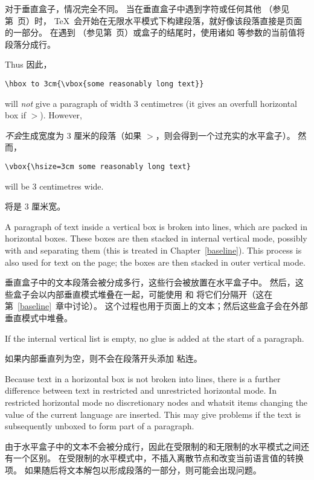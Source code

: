对于垂直盒子，情况完全不同。
当在垂直盒子中遇到字符或任何其他 
（参见第~\pageref{h:com:list}页）时，
\TeX\ 会开始在无限水平模式下构建段落，就好像该段落直接是页面的一部分。
在遇到 
（参见第\pageref{v:com:list}~页）或盒子的结尾时，使用诸如  等参数的当前值将段落分成行。

Thus 因此，\begin{verbatim}
\hbox to 3cm{\vbox{some reasonably long text}}
\end{verbatim}
will {\sl not\/} give a paragraph of width 3 centimetres 
(it gives an overfull horizontal box if ${}>{}$\n{3cm}).
However,

{\sl 不会}生成宽度为 3 厘米的段落（如果 ${}>{}$\n{3cm}，则会得到一个过充实的水平盒子）。
然而，
\begin{verbatim}
\vbox{\hsize=3cm some reasonably long text}
\end{verbatim}
will be 3 centimetres wide.

将是 3 厘米宽。

A paragraph of text inside a vertical box is broken into
lines, which are packed in horizontal boxes.
These boxes  are then stacked
in internal vertical mode, possibly with
 and  separating them
(this is treated in Chapter~\ref{baseline}).
This process is also used for text on the page; the boxes
are then stacked in outer vertical mode.

垂直盒子中的文本段落会被分成多行，这些行会被放置在水平盒子中。
然后，这些盒子会以内部垂直模式堆叠在一起，可能使用  和  将它们分隔开（这在第~\ref{baseline}~章中讨论）。
这个过程也用于页面上的文本；然后这些盒子会在外部垂直模式中堆叠。

If the internal vertical list is empty, no 
glue is added at the start of a paragraph.

如果内部垂直列为空，则不会在段落开头添加  粘连。

Because text in a horizontal box is not
\label{wide:vbox}%
broken into lines, there is a further
difference between text in restricted and unrestricted
\awp
horizontal mode. In restricted horizontal mode no
discretionary nodes and whatsit items changing the
value of the current language are inserted.
This may give problems if the text is subsequently
unboxed to form part of a paragraph.

由于水平盒子中的文本不会被分成行，因此在受限制的和无限制的水平模式之间还有一个区别。
在受限制的水平模式中，不插入离散节点和改变当前语言值的转换项。
如果随后将文本解包以形成段落的一部分，则可能会出现问题。

